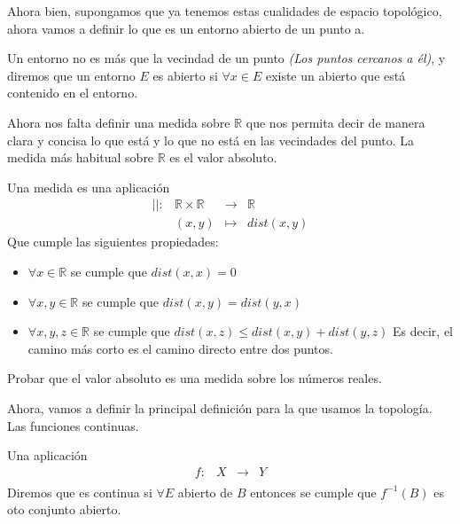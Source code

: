 Ahora bien, supongamos que ya tenemos estas cualidades de espacio topológico, ahora vamos a definir lo que es un entorno abierto de un punto a. 
\begin{defi}
Un entorno no es más que la vecindad de un punto \emph{(Los puntos cercanos a él)}, y diremos que un entorno $E$ es abierto si $\forall x \in E $ existe un abierto que está contenido en el entorno. 

\end{defi}

Ahora nos falta definir una medida sobre $\mathbb{R}$ que nos permita decir de manera clara y concisa lo que está y lo que no está en las vecindades del punto. La medida más habitual sobre $\mathbb{R}$ es el valor absoluto. 


\begin{defi}
Una medida es una aplicación 
$$
\begin{array}{rccl}
||  \colon & \mathbb{R} \times \mathbb{R} & \longrightarrow & \mathbb{R}\\
&(x,y) & \longmapsto & dist(x,y)
\end{array}
$$
\noindent
Que cumple las siguientes propiedades:
\begin{itemize}
\item $\forall x \in \mathbb{R} $ se cumple que $dist(x,x)=0$
\item $\forall x,y\in \mathbb{R}$ se cumple que $dist(x,y)=dist(y,x)$ 
\item $\forall x,y,z \in \mathbb{R}$ se cumple que $dist(x,z)\leq dist(x,y)+dist(y,z)$ Es decir, el camino más corto es el camino directo entre dos puntos.
\end{itemize}

\end{defi}

\begin{ejercicio}
Probar que el valor absoluto es una medida sobre los números reales. 
\end{ejercicio}

Ahora, vamos a definir la principal definición para la que usamos la topología. Las funciones continuas. 

\begin{defi}
Una aplicación
$$
\begin{array}{rccl}
f  \colon & X & \longrightarrow & Y\\

\end{array}
$$
Diremos que es continua si $\forall E$ abierto de $B$ entonces se cumple que $f^{-1}(B)$ es oto conjunto abierto. 
\end{defi}

